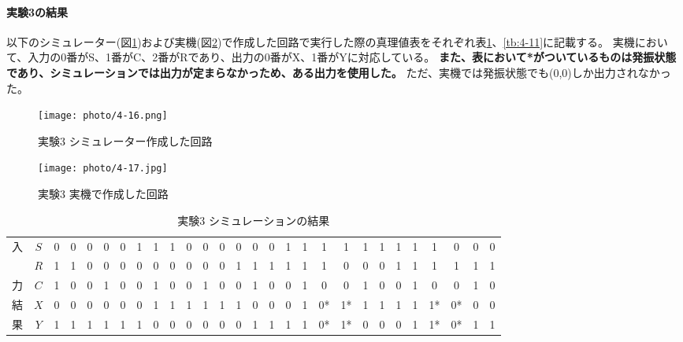\documentclass[dvipdfmx]{jsarticle}
\begin{document}
\paragraph{実験3の結果}
以下のシミュレーター(図\ref{fig:4-16})および実機(図\ref{fig:4-17})で作成した回路で実行した際の真理値表をそれぞれ表\ref{tb:4-10}、\ref{tb:4-11}に記載する。
実機において、入力の0番がS、1番がC、2番がRであり、出力の0番がX、1番がYに対応している。
\textbf{また、表において*がついているものは発振状態であり、シミュレーションでは出力が定まらなかっため、ある出力を使用した。}
ただ、実機では発振状態でも(0,0)しか出力されなかった。

\begin{figure}[h]
  \begin{center}
    \texttt{[image: photo/4-16.png]}
  \end{center}
  \caption{実験3 シミュレーター作成した回路}
  \label{fig:4-16}
\end{figure}

\begin{figure}[H]
  \begin{center}
    \texttt{[image: photo/4-17.jpg]}
  \end{center}
  \caption{実験3 実機で作成した回路}
  \label{fig:4-17}
\end{figure}

\begin{table}[H]
  \caption{実験3 シミュレーションの結果}
  \centering
  \begin{tabular}{|c|c|c|c|c|c|c|c|c|c|c|c|c|c|c|c|c|c|c|c|c|c|c|c|c|c|c|c|} \hline
    入& $S$ & 0 & 0 & 0 & 0 & 0 & 1 & 1 & 1 & 0 & 0 & 0 & 0 & 0 & 0 & 1 & 1 & 1 & 1 & 1 & 1 & 1 & 1 & 1 & 0 & 0 & 0 \\ 
      & $R$ & 1 & 1 & 0 & 0 & 0 & 0 & 0 & 0 & 0 & 0 & 0 & 1 & 1 & 1 & 1 & 1 & 1 & 0 & 0 & 0 & 1 & 1 & 1 & 1 & 1 & 1 \\ 
    力& $C$ & 1 & 0 & 0 & 1 & 0 & 0 & 1 & 0 & 0 & 1 & 0 & 0 & 1 & 0 & 0 & 1 & 0 & 0 & 1 & 0 & 0 & 1 & 0 & 0 & 1 & 0 \\ \hline\hline
    結& $X$ & 0 & 0 & 0 & 0 & 0 & 0 & 1 & 1 & 1 & 1 & 1 & 1 & 0 & 0 & 0 & 1 & 0* & 1* & 1 & 1 & 1 & 1 & 1* & 0* & 0 & 0\\ 
    果& $Y$ & 1 & 1 & 1 & 1 & 1 & 1 & 0 & 0 & 0 & 0 & 0 & 0 & 1 & 1 & 1 & 1 & 0* & 1* & 0 & 0 & 0 & 1 & 1* & 0* & 1 & 1\\ \hline
  \end{tabular}
  \label{tb:4-10}
\end{table}
\end{document}
